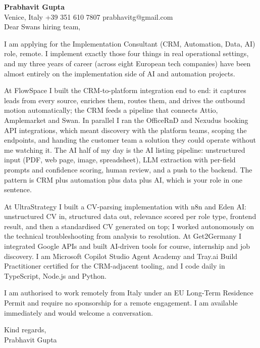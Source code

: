 \documentclass[a4paper,10.5pt]{article}
\begin{document}
\textbf{Prabhavit Gupta}\\
Venice, Italy \textbar{} +39 351 610 7807 \textbar{} prabhavitg@gmail.com\\[10pt]
Dear Swans hiring team,

I am applying for the Implementation Consultant (CRM, Automation, Data, AI) role, remote. I implement exactly those four things in real operational settings, and my three years of career (across eight European tech companies) have been almost entirely on the implementation side of AI and automation projects.

At FlowSpace I built the CRM-to-platform integration end to end: it captures leads from every source, enriches them, routes them, and drives the outbound motion automatically; the CRM feeds a pipeline that connects Attio, Amplemarket and Swan. In parallel I ran the OfficeRnD and Nexudus booking API integrations, which meant discovery with the platform teams, scoping the endpoints, and handing the customer team a solution they could operate without me watching it. The AI half of my day is the AI listing pipeline: unstructured input (PDF, web page, image, spreadsheet), LLM extraction with per-field prompts and confidence scoring, human review, and a push to the backend. The pattern is CRM plus automation plus data plus AI, which is your role in one sentence.

At UltraStrategy I built a CV-parsing implementation with n8n and Eden AI: unstructured CV in, structured data out, relevance scored per role type, frontend result, and then a standardised CV generated on top; I worked autonomously on the technical troubleshooting from analysis to resolution. At Get2Germany I integrated Google APIs and built AI-driven tools for course, internship and job discovery. I am Microsoft Copilot Studio Agent Academy and Tray.ai Build Practitioner certified for the CRM-adjacent tooling, and I code daily in TypeScript, Node.js and Python.

I am authorised to work remotely from Italy under an EU Long-Term Residence Permit and require no sponsorship for a remote engagement. I am available immediately and would welcome a conversation.

Kind regards,\\
Prabhavit Gupta
\end{document}
